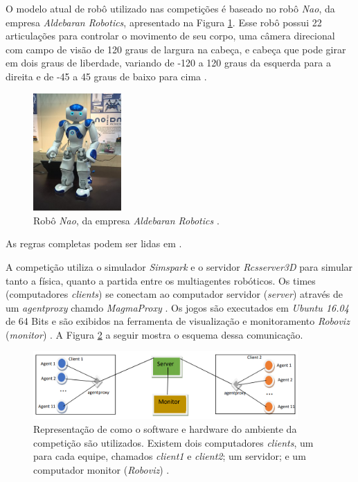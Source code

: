 \documentclass[a4paper,12pt]{article}
\begin{document}
O modelo atual de robô utilizado nas competições é baseado no robô \textit{Nao}, da empresa \textit{Aldebaran Robotics}, apresentado na Figura \ref{fig:nao_robot}. Esse robô possui 22 articulações para controlar o movimento de seu corpo, uma câmera direcional com campo de visão de 120 graus de largura na cabeça, e cabeça que pode girar em dois graus de liberdade, variando de -120 a 120 graus da esquerda para a direita e de -45 a 45 graus de baixo para cima \cite{robot-nao}.

\begin{figure}[H]
	\centering
	\includegraphics[width=0.3\textwidth]{figures/nao-robot.jpg}
   \caption{Robô \textit{Nao}, da empresa \textit{Aldebaran Robotics} \cite{robot-nao}.} \label{fig:nao_robot}
\end{figure}

As regras completas podem ser lidas em \cite{soccer3d-rules}.

A competição utiliza o simulador \textit{Simspark} \cite{simspark} e o servidor \textit{Rcsserver3D} \cite{rcssserver3d} para simular tanto a física, quanto a partida entre os multiagentes robóticos. Os times (computadores \textit{clients}) se conectam ao computador servidor (\textit{server}) através de um \textit{agentproxy} chamdo \textit{MagmaProxy} \cite{magma-proxy}. Os jogos são executados em \textit{Ubuntu 16.04} de 64 Bits e são exibidos na ferramenta de visualização e monitoramento \textit{Roboviz} (\textit{monitor}) \cite{roboviz}. A Figura \ref{fig:computers-schema} a seguir mostra o esquema dessa comunicação.

\begin{figure}[H]
	\centering
	\includegraphics[width=0.9\textwidth]{figures/computers-schema.png}
   \caption{Representação de como o software e hardware do ambiente da competição são utilizados. Existem dois computadores \textit{clients}, um para cada equipe, chamados \textit{client1} e \textit{client2}; um servidor; e um computador monitor (\textit{Roboviz}) \cite{soccer3d-rules}.} \label{fig:computers-schema}
\end{figure}
\end{document}
